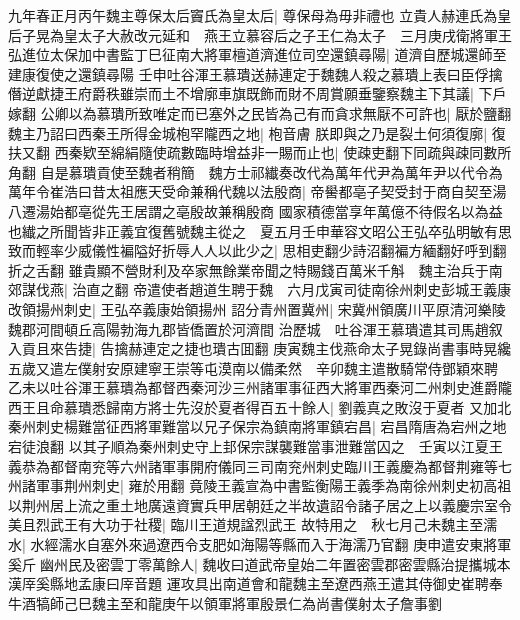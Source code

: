 九年春正月丙午魏主尊保太后竇氏為皇太后|{
	尊保母為毋非禮也}
立貴人赫連氏為皇后子晃為皇太子大赦改元延和　燕王立慕容后之子王仁為太子　三月庚戌衛將軍王弘進位太保加中書監丁巳征南大將軍檀道濟進位司空還鎮尋陽|{
	道濟自歷城還師至建康復使之還鎮尋陽}
壬申吐谷渾王慕璝送赫連定于魏魏人殺之慕璝上表曰臣俘擒僭逆獻捷王府爵秩雖崇而土不增廓車旗既飾而財不周賞願垂鑒察魏主下其議|{
	下戶嫁翻}
公卿以為慕璝所致唯定而已塞外之民皆為己有而貪求無厭不可許也|{
	厭於鹽翻}
魏主乃詔曰西秦王所得金城枹罕隴西之地|{
	枹音膚}
朕即與之乃是裂土何須復廓|{
	復扶又翻}
西秦欵至綿絹隨使疏數臨時增益非一賜而止也|{
	使疎吏翻下同疏與疎同數所角翻}
自是慕璝貢使至魏者稍簡　魏方士祁纎奏改代為萬年代尹為萬年尹以代令為萬年令崔浩曰昔太祖應天受命兼稱代魏以法殷商|{
	帝嚳都亳子契受封于商自契至湯八遷湯始都亳從先王居謂之亳殷故兼稱殷商}
國家積德當享年萬億不待假名以為益也纎之所聞皆非正義宜復舊號魏主從之　夏五月壬申華容文昭公王弘卒弘明敏有思致而輕率少威儀性褊隘好折辱人人以此少之|{
	思相吏翻少詩沼翻褊方緬翻好呼到翻折之舌翻}
雖貴顯不營財利及卒家無餘業帝聞之特賜錢百萬米千斛　魏主治兵于南郊謀伐燕|{
	治直之翻}
帝遣使者趙道生聘于魏　六月戊寅司徒南徐州刺史彭城王義康改領揚州刺史|{
	王弘卒義康始領揚州}
詔分青州置冀州|{
	宋冀州領廣川平原清河樂陵魏郡河間頓丘高陽勃海九郡皆僑置於河濟間}
治歷城　吐谷渾王慕璝遣其司馬趙叙入貢且來告捷|{
	告擒赫連定之捷也璝古囬翻}
庚寅魏主伐燕命太子晃錄尚書事時晃纔五歲又遣左僕射安原建寧王崇等屯漠南以備柔然　辛卯魏主遣散騎常侍鄧穎來聘　乙未以吐谷渾王慕璝為都督西秦河沙三州諸軍事征西大將軍西秦河二州刺史進爵隴西王且命慕璝悉歸南方將士先沒於夏者得百五十餘人|{
	劉義真之敗沒于夏者}
又加北秦州刺史楊難當征西將軍難當以兄子保宗為鎮南將軍鎮宕昌|{
	宕昌隋唐為宕州之地宕徒浪翻}
以其子順為秦州刺史守上邽保宗謀襲難當事泄難當囚之　壬寅以江夏王義恭為都督南兖等六州諸軍事開府儀同三司南兖州刺史臨川王義慶為都督荆雍等七州諸軍事荆州刺史|{
	雍於用翻}
竟陵王義宣為中書監衡陽王義季為南徐州刺史初高祖以荆州居上流之重土地廣遠資實兵甲居朝廷之半故遺詔令諸子居之上以義慶宗室令美且烈武王有大功于社稷|{
	臨川王道規諡烈武王}
故特用之　秋七月己未魏主至濡水|{
	水經濡水自塞外來過遼西令支肥如海陽等縣而入于海濡乃官翻}
庚申遣安東將軍奚斤幽州民及密雲丁零萬餘人|{
	魏收曰道武帝皇始二年置密雲郡密雲縣治提攜城本漢厗奚縣地孟康曰厗音題}
運攻具出南道會和龍魏主至遼西燕王遣其侍御史崔聘奉牛酒犒師己巳魏主至和龍庚午以領軍將軍殷景仁為尚書僕射太子詹事劉

